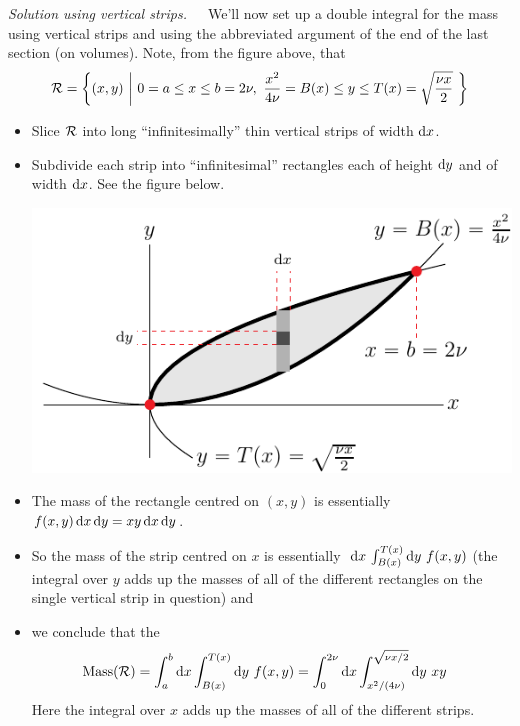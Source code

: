\begin{eg}[Mass]
\medskip\noindent\emph{Solution using vertical strips.}\ \ \
We'll now set up a double integral for the mass using vertical strips
and using the abbreviated argument of the end of the last section 
(on volumes).  Note, from the figure above, that
\begin{equation*}
\cR=\bigg\{(x,y)\ \bigg|\ 0=a\le x\le b=2\nu,\ 
        \frac{x^2}{4\nu}= B(x)\le y\le T(x) = \sqrt{\frac{\nu x}{2}}\ \bigg\}
\end{equation*}
\begin{itemize}
\item
   Slice $\mathcal{R}$ into long ``infinitesimally'' thin 
   vertical strips of width $\mathrm{d}x$.
\item
   Subdivide each strip into ``infinitesimal'' rectangles each of 
   height $\mathrm{d}y$ and of width $\mathrm{d}x$. See the figure below.
\begin{efig}
\begin{center}
   \includegraphics{dblIntAb.pdf}
\end{center}
\end{efig}

\item
  The mass of the rectangle centred on $(x,y)$
        is essentially $f(x,y)\,\mathrm{d}x\,\mathrm{d}y=xy\,\mathrm{d}x\,\mathrm{d}y$.
\item 
   So the mass of the strip centred on $x$ is 
         essentially $\ \mathrm{d}x\, \int_{B(x)}^{T(x)}\mathrm{d}y\ f(x,y) $ 
   (the integral over $y$ adds up the masses of all of the different rectangles     on the single vertical strip in question) and  
\item
   we conclude that the
\begin{align*}
    \text{Mass}(\mathcal{R})
        &=\int_a^b \mathrm{d}x\int_{B(x)}^{T(x)} \mathrm{d}y\ f(x,y) 
         =\int_0^{2\nu} \mathrm{d}x\int_{x^2/(4\nu)}^{\sqrt{\nu x/2}} \mathrm{d}y\ xy 
\end{align*}
Here the integral over $x$ adds up the masses of all of the different strips.


\end{itemize}
\end{eg}
